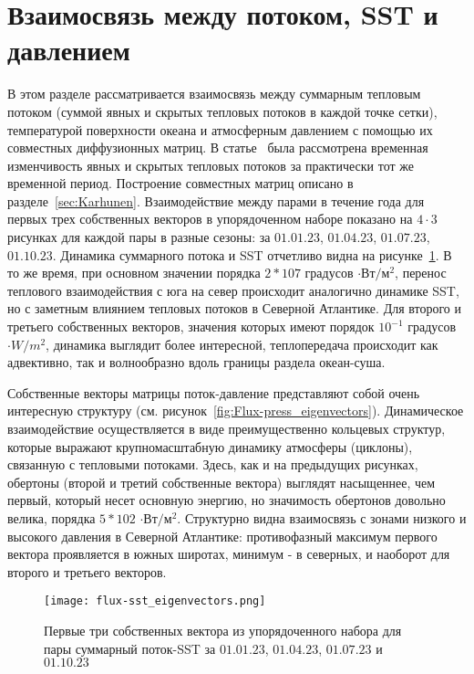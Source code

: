 \section{Взаимосвязь между потоком, SST и давлением}
В этом разделе рассматривается взаимосвязь между суммарным тепловым потоком (суммой явных и скрытых тепловых потоков в каждой точке сетки), температурой поверхности океана и атмосферным давлением с помощью их совместных диффузионных матриц. В статье~\cite{gorshenin2023stochastic} была рассмотрена временная изменчивость явных и скрытых тепловых потоков за практически тот же временной период. Построение совместных матриц описано в разделе~\ref{sec:Karhunen}. Взаимодействие между парами в течение года для первых трех собственных векторов в упорядоченном наборе показано на $4 \cdot 3$ рисунках для каждой пары в разные сезоны: за $01.01.23$, $01.04.23$, $01.07.23$, $01.10.23$. Динамика суммарного потока и SST отчетливо видна на рисунке~\ref{fig:Flux-SST_eigenvectors}. В то же время, при основном значении порядка $2*107$ градусов $\cdot Вт/м^2$, перенос теплового взаимодействия с юга на север происходит аналогично динамике SST, но с заметным влиянием тепловых потоков в Северной Атлантике. Для второго и третьего собственных векторов, значения которых имеют порядок $10^{-1}$ градусов $\cdot W/m^2$, динамика выглядит более интересной, теплопередача происходит как адвективно, так и волнообразно вдоль границы раздела океан-суша.

Собственные векторы матрицы поток-давление представляют собой очень интересную структуру (см. рисунок~\ref{fig:Flux-press_eigenvectors}). Динамическое взаимодействие осуществляется в виде преимущественно кольцевых структур, которые выражают крупномасштабную динамику атмосферы (циклоны), связанную с тепловыми потоками. Здесь, как и на предыдущих рисунках, обертоны (второй и третий собственные вектора) выглядят насыщеннее, чем первый, который несет основную энергию, но значимость обертонов довольно велика, порядка $5*102$ $\cdot Вт/м^2$. Структурно видна взаимосвязь с зонами низкого и высокого давления в Северной Атлантике: противофазный максимум первого вектора проявляется в южных широтах, минимум - в северных, и наоборот для второго и третьего векторов.

\begin{figure}
	\centering
	\texttt{[image: flux-sst\_eigenvectors.png]}
	\caption{Первые три собственных вектора из упорядоченного набора для пары суммарный поток-SST за $01.01.23$, $01.04.23$, $01.07.23$ и $01.10.23$}
	\label{fig:Flux-SST_eigenvectors}
\end{figure}

